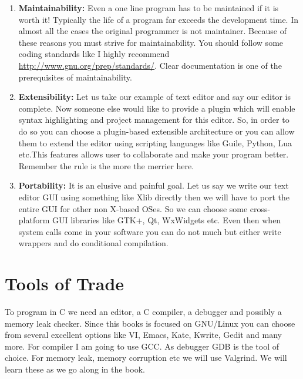 \begin{enumerate}
\item \textbf{Maintainability:} Even a one line program has to be maintained if
  it is worth it! Typically the life of a program far exceeds the development
  time. In almost all the cases the original programmer is not
  maintainer. Because of these reasons you must strive for maintainability. You
  should follow some coding standards like I highly recommend
  \url{http://www.gnu.org/prep/standards/}. Clear documentation is one of the
  prerequisites of maintainability.

\item \textbf{Extensibility:} Let us take our example of text editor and say
  our editor is complete. Now someone else would like to provide a plugin which
  will enable syntax highlighting and project management for this editor. So,
  in order to do so you can choose a plugin-based extensible architecture or
  you can allow them to extend the editor using scripting languages like Guile,
  Python, Lua etc.This features allows user to collaborate and make your
  program better. Remember the rule is the more the merrier here.

\item \textbf{Portability:} It is an elusive and painful goal. Let us say we
  write our text editor GUI using something like Xlib directly then we will
  have to port the entire GUI for other non X-based OSes. So we can choose some
  cross-platform GUI libraries like GTK+, Qt, WxWidgets etc. Even then when
  system calls come in your software you can do not much but either write
  wrappers and do conditional compilation.
\end{enumerate}

\section{Tools of Trade}
To program in C we need an editor, a C compiler, a debugger and possibly a
memory leak checker. Since this books is focused on GNU/Linux you can choose
from several excellent options like VI, Emacs, Kate, Kwrite, Gedit and many
more. For compiler I am going to use GCC. As debugger GDB is the tool of
choice. For memory leak, memory corruption etc we will use Valgrind. We will
learn these as we go along in the book.

